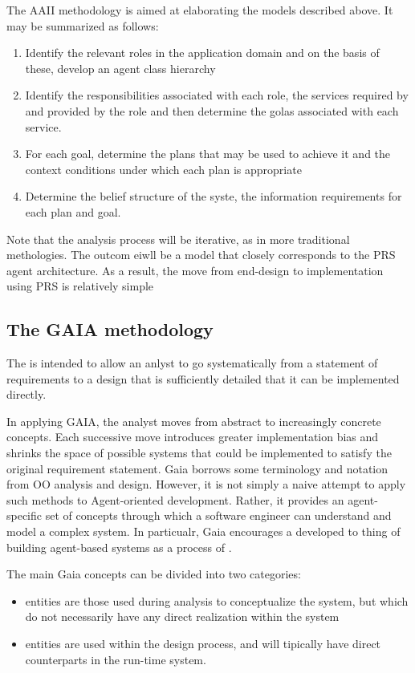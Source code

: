 The AAII methodology is aimed at elaborating the models described above. It may be summarized as follows:
\begin{enumerate}
\item Identify the relevant roles in the application domain and on the basis of these, develop an agent class hierarchy
\item Identify the responsibilities associated with each role, the services required by and provided by the role and then determine the golas associated with each service.
\item For each goal, determine the plans that may be used to achieve it and the context conditions under which each plan is appropriate
\item Determine the belief structure of the syste, the information requirements for each plan and goal.
\end{enumerate}
Note that the analysis process will be iterative, as in more traditional methologies. The outcom eiwll be a model that closely corresponds to the PRS agent architecture. As a result, the move from end-design to implementation using PRS is relatively simple
\subsection{The GAIA methodology}
The  is intended to allow an anlyst to go systematically from a statement of requirements to a design that is sufficiently detailed that it can be implemented directly.

In applying GAIA, the analyst moves from abstract to increasingly concrete concepts. Each successive move introduces greater implementation bias and shrinks the space of possible systems that  could be implemented to satisfy the original requirement statement.
Gaia borrows some terminology and notation from OO analysis and design. However, it is not simply a naive attempt to apply such methods to Agent-oriented development. Rather, it provides an agent-specific set of concepts through which a software engineer can understand and model a complex system. In particualr, Gaia encourages a developed to thing of building agent-based systems as a process of .

The main Gaia concepts can be divided into two categories: 
\begin{itemize}
\item {} entities are those used during analysis to conceptualize the system, but which do not necessarily have any direct realization within the system
\item {} entities are used within the design process, and will tipically have direct counterparts in the run-time system.
\end{itemize}

